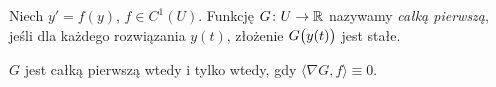%
\begin{definition}
  Niech $y' = f(y)$, $f \in C^1(U)$. Funkcję $G \colon U \to \R$ nazywamy \emph{całką pierwszą}, jeśli dla każdego 
  rozwiązania $y(t)$, złożenie $G \p[\big]{y(t)}$ jest stałe.
\end{definition}
%
\begin{lemma}
  $G$ jest całką pierwszą wtedy i tylko wtedy, gdy $\langle \nabla G, f \rangle \equiv 0$.
\end{lemma}